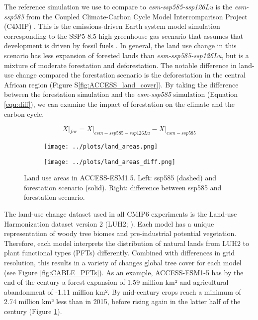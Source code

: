 \documentclass[]{article}
\begin{document}
The reference simulation we use to compare to \textit{esm-ssp585-ssp126Lu} is the \textit{esm-ssp585} from the Coupled Climate-Carbon Cycle Model Intercomparison Project (C4MIP) \parencite{jones_c4mip_2016}.
This is the emissions-driven Earth system model simulation corresponding to the SSP5-8.5 high greenhouse gas scenario that assumes that development is driven by fossil fuels \parencite{oneill_scenario_2016}.
In general, the land use change in this scenario has less expansion of forested lands than \textit{esm-ssp585-ssp126Lu}, but is a mixture of moderate forestation and deforestation.
The notable difference in land-use change compared the forestation scenario is the deforestation in the central African region (Figure S\ref{fig:ACCESS_land_cover}).
By taking the difference between the forestation simulation and the \textit{esm-ssp585} simulation (Equation \ref{equ:diff}), we can examine the impact of forestation on the climate and the carbon cycle.

\begin{equation}
    X|_{for} = X|_{esm-ssp585-ssp126Lu} - X|_{esm-ssp585}
    \label{equ:diff}
\end{equation}

\begin{figure}[H]
    \centering
    \begin{subfigure}[b]{0.45\linewidth}
        \texttt{[image: ../plots/land\_areas.png]}
    \end{subfigure}
    \begin{subfigure}[b]{0.45\linewidth}

        \texttt{[image: ../plots/land\_areas\_diff.png]}
    \end{subfigure}
    \caption{Land use areas in ACCESS-ESM1.5. Left: ssp585 (dashed) and forestation scenario (solid). Right: difference between ssp585 and forestation scenario.}
    \label{fig:land_use}
\end{figure}

The land-use change dataset used in all CMIP6 experiments is the Land-use Harmonization dataset version 2 (LUH2; \cite{hurtt_harmonization_2020}).
Each model has a unique representation of woody tree biomes and pre-industrial potential vegetation.
Therefore, each model interprets the distribution of natural lands from LUH2 to plant functional types (PFTs) differently.
Combined with differences in grid resolution, this results in a variety of changes global tree cover for each model (see Figure \ref{fig:CABLE_PFTs}).
As an example, ACCESS-ESM1-5 has by the end of the century a forest expansion of 1.59 million km² and agricultural abandonment of -1.11 million km².
By mid-century crops reach a minimum of 2.74 million km² less than in 2015, before rising again in the latter half of the century (Figure \ref{fig:land_use}).
\end{document}
